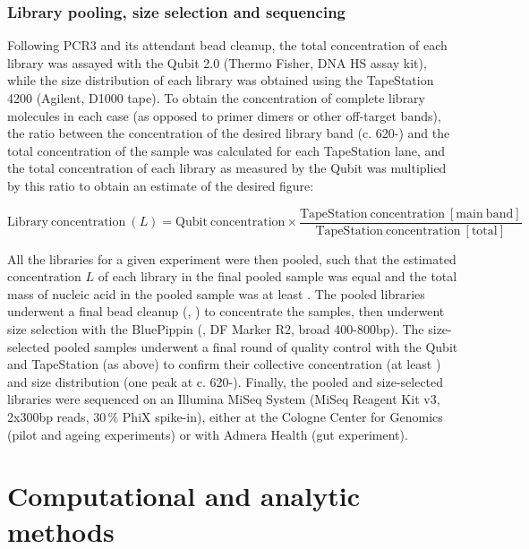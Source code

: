 \subsubsection{Library pooling, size selection and sequencing} 
\label{sec:methods_molec_igseq_seq}

Following PCR3 and its attendant bead cleanup, the total concentration of each library was assayed with the Qubit 2.0 (Thermo Fisher, DNA HS assay kit), while the size distribution of each library was obtained using the TapeStation 4200 (Agilent, D1000 tape). To obtain the concentration of complete library molecules in each case (as opposed to primer dimers or other off-target bands), the ratio between the concentration of the desired library band (c. 620-) and the total concentration of the sample was calculated for each TapeStation lane, and the total concentration of each library as measured by the Qubit was multiplied by this ratio to obtain an estimate of the desired figure:

\begin{equation}
\mathrm{Library~concentration}~(L) = \mathrm{Qubit~concentration} \times \frac{\mathrm{TapeStation~concentration~[main~band]}}{\mathrm{TapeStation~concentration~[total]}}
\label{eq:library-conc}
\end{equation}

\noindent All the libraries for a given experiment were then pooled, such that the estimated concentration $L$ of each library in the final pooled sample was equal and the total mass of nucleic acid in the pooled sample was at least . The pooled libraries underwent a final bead cleanup (, ) to concentrate the samples, then underwent size selection with the BluePippin (,  DF Marker R2, broad 400-800bp). The size-selected pooled samples underwent a final round of quality control with the Qubit and TapeStation (as above) to confirm their collective concentration (at least ) and size distribution (one peak at c. 620-). Finally, the pooled and size-selected libraries were sequenced on an Illumina MiSeq System (MiSeq Reagent Kit v3, 2x300bp reads, 30\,\% PhiX spike-in), either at the Cologne Center for Genomics (pilot and ageing experiments) or with Admera Health (gut experiment).

\section{Computational and analytic methods}
\label{sec:methods_comp}

